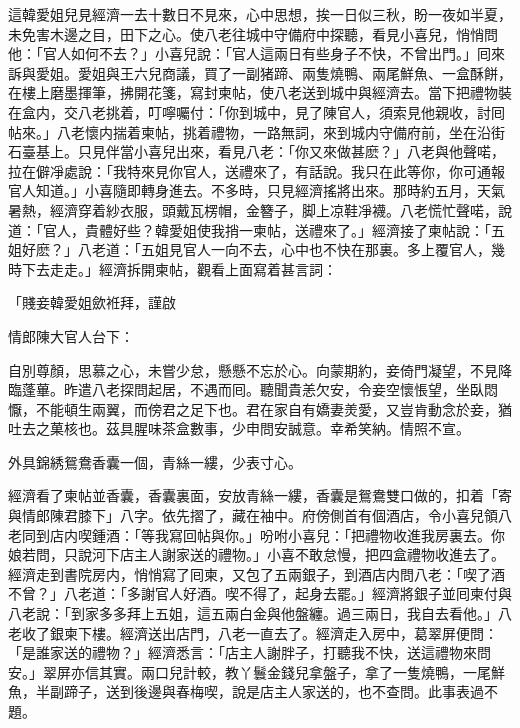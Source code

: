 這韓愛姐兒見經濟一去十數日不見來，心中思想，挨一日似三秋，盼一夜如半夏，未免害木邊之目，田下之心。使八老往城中守備府中探聽，看見小喜兒，悄悄問他：「官人如何不去？」小喜兒說：「官人這兩日有些身子不快，不曾出門。」囘來訴與愛姐。愛姐與王六兒商議，買了一副猪蹄、兩隻燒鴨、兩尾鮮魚、一盒酥餅，在樓上磨墨揮筆，拂開花箋，寫封柬帖，使八老送到城中與經濟去。當下把禮物裝在盒内，交八老挑着，叮嚀囑付：「你到城中，見了陳官人，須索見他親收，討囘帖來。」八老懷内揣着柬帖，挑着禮物，一路無詞，來到城内守備府前，坐在沿街石臺基上。只見伴當小喜兒出來，看見八老：「你又來做甚麽？」八老與他聲喏，拉在僻凈處說：「我特來見你官人，送禮來了，有話說。我只在此等你，你可通報官人知道。」小喜隨即轉身進去。不多時，只見經濟搖將出來。那時約五月，天氣暑熱，經濟穿着紗衣服，頭戴瓦楞帽，金簪子，脚上凉鞋凈襪。八老慌忙聲喏，說道：「官人，貴體好些？韓愛姐使我捎一柬帖，送禮來了。」經濟接了柬帖說：「五姐好麽？」八老道：「五姐見官人一向不去，心中也不快在那裏。多上覆官人，幾時下去走走。」經濟拆開柬帖，觀看上面寫着甚言詞：

\begin{myquote}[\markfont]
「賤妾韓愛姐歛袵拜，謹啟

情郎陳大官人台下：

自別尊顏，思慕之心，未嘗少怠，懸懸不忘於心。向蒙期約，妾倚門凝望，不見降臨蓬蓽。昨遣八老探問起居，不遇而囘。聽聞貴恙欠安，令妾空懷悵望，坐臥悶懨，不能頓生兩翼，而傍君之足下也。君在家自有嬌妻羙愛，又豈肯動念於妾，猶吐去之菓核也。茲具腥味茶盒數事，少申問安誠意。幸希笑納。情照不宣。

外具錦綉鴛鴦香囊一個，青絲一縷，少表寸心。

\end{myquote}

經濟看了柬帖並香囊，香囊裏面，安放青絲一縷，香囊是鴛鴦雙口做的，扣着「寄與情郎陳君膝下」八字。依先摺了，藏在袖中。府傍側首有個酒店，令小喜兒領八老同到店内喫鍾酒：「等我寫回帖與你。」吩咐小喜兒：「把禮物收進我房裏去。你娘若問，只說河下店主人謝家送的禮物。」小喜不敢怠慢，把四盒禮物收進去了。經濟走到書院房内，悄悄寫了囘柬，又包了五兩銀子，到酒店内問八老：「喫了酒不曾？」八老道：「多謝官人好酒。喫不得了，起身去罷。」經濟將銀子並囘柬付與八老說：「到家多多拜上五姐，這五兩白金與他盤纏。過三兩日，我自去看他。」八老收了銀柬下樓。經濟送出店門，八老一直去了。經濟走入房中，葛翠屏便問：「是誰家送的禮物？」經濟悉言：「店主人謝胖子，打聽我不快，送這禮物來問安。」翠屏亦信其實。兩口兒計較，教丫鬟金錢兒拿盤子，拿了一隻燒鴨，一尾鮮魚，半副蹄子，送到後邊與春梅喫，說是店主人家送的，也不查問。此事表過不題。

